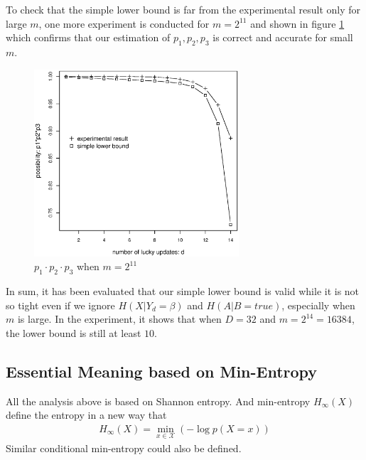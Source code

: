 \documentclass[10pt, conference, compsocconf]{IEEEtran}
\begin{document}
		To check that the simple lower bound is far from the experimental
		result only for large $m$, one more experiment is conducted
		for $m = 2^{11}$ and shown in figure \ref{p11}
		which confirms that our estimation
		of $p_1, p_2, p_3$ is correct and accurate for small $m$.

		\begin{figure}[!t]
		\centering
		\includegraphics[width=3in, trim=0mm 0mm 0mm 20mm]{p11.eps}
		\caption{$p_1 \cdot p_2 \cdot p_3$ when $m = 2^{11}$}\label{p11}
		\end{figure}
		
		In sum, it has been evaluated that our simple lower bound
		is valid while it is not so tight even if we ignore
		$H(X | Y_d = \beta)$ and $H(A | B = true)$, especially
		when $m$ is large. In the experiment,
		it shows that when $D = 32$ and $m = 2^{14} = 16384$, the lower bound
		is still at least $10$.

\subsection{Essential Meaning based on Min-Entropy}
	All the analysis above is based on Shannon entropy.
	And min-entropy $H_\infty(X)$ define the entropy in a new way that
	\begin{align*}
		H_\infty(X) = \min_{x \in \mathcal X} \left(-\log p\left(X = x\right) \right)
	\end{align*}
	Similar conditional min-entropy could also be defined.
	
\end{document}
